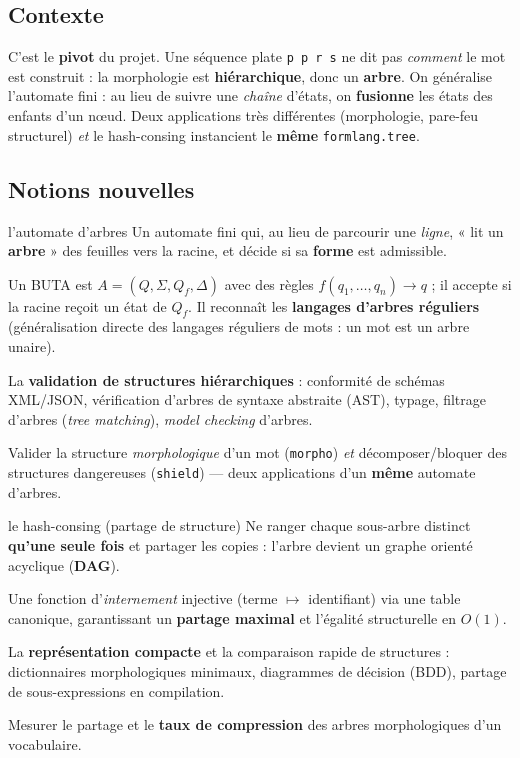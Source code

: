 \documentclass[11pt,a4paper]{scrartcl}
\begin{document}
\subsection{Contexte}
C'est le \textbf{pivot} du projet. Une séquence plate \texttt{p p r s} ne dit pas
\emph{comment} le mot est construit : la morphologie est \textbf{hiérarchique}, donc un
\textbf{arbre}. On généralise l'automate fini : au lieu de suivre une \emph{chaîne}
d'états, on \textbf{fusionne} les états des enfants d'un nœud. Deux applications très
différentes (morphologie, pare-feu structurel) \emph{et} le hash-consing instancient le
\textbf{même} \texttt{formlang.tree}.

\subsection{Notions nouvelles}
\begin{objetformel}{l'automate d'arbres}
 Un automate fini qui, au lieu de parcourir une \emph{ligne}, « lit un
\textbf{arbre} » des feuilles vers la racine, et décide si sa \textbf{forme} est admissible.

 Un BUTA est $A=(Q,\Sigma,Q_f,\Delta)$ avec des règles
$f(q_1,\dots,q_n)\to q$ ; il accepte si la racine reçoit un état de $Q_f$. Il reconnaît les
\textbf{langages d'arbres réguliers} (généralisation directe des langages réguliers de mots :
un mot est un arbre unaire).

 La \textbf{validation de structures hiérarchiques} : conformité
de schémas XML/JSON, vérification d'arbres de syntaxe abstraite (AST), typage, filtrage
d'arbres (\emph{tree matching}), \emph{model checking} d'arbres.

 Valider la structure \emph{morphologique} d'un mot (\texttt{morpho})
\emph{et} décomposer/bloquer des structures dangereuses (\texttt{shield}) — deux applications
d'un \textbf{même} automate d'arbres.
\end{objetformel}

\begin{objetformel}{le hash-consing (partage de structure)}
 Ne ranger chaque sous-arbre distinct \textbf{qu'une seule fois} et
partager les copies : l'arbre devient un graphe orienté acyclique (\textbf{DAG}).

 Une fonction d'\emph{internement} injective (terme $\mapsto$
identifiant) via une table canonique, garantissant un \textbf{partage maximal} et l'égalité
structurelle en $O(1)$.

 La \textbf{représentation compacte} et la comparaison rapide de
structures : dictionnaires morphologiques minimaux, diagrammes de décision (BDD), partage de
sous-expressions en compilation.

 Mesurer le partage et le \textbf{taux de compression} des arbres
morphologiques d'un vocabulaire.
\end{objetformel}
\end{document}
